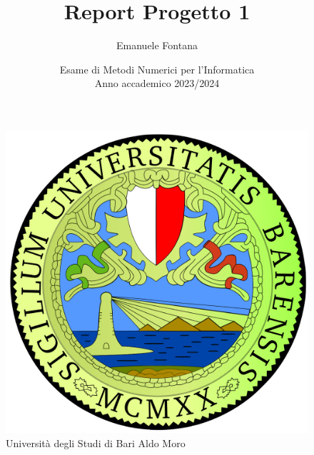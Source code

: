 \documentclass[12pt]{article}
\begin{document}
    \pagestyle{fancy}
    \everymath{\displaystyle}
    \sffamily
    \begin{figure}
        \centering
        \includegraphics[scale=0.1]{images/uniba-logo.png}
        \caption*{Università degli Studi di Bari Aldo Moro}
    \end{figure}
    
    \title{Report Progetto 1}
    \author{Emanuele Fontana}
    \date{Esame di Metodi Numerici per l'Informatica \\Anno accademico 2023/2024}
    \maketitle
    \tableofcontents\newpage
    \newpage
    
    \newpage
    
    \newpage
    
    \newpage
    
    \newpage
    
    \newpage
    
    \newpage
    
\end{document}
